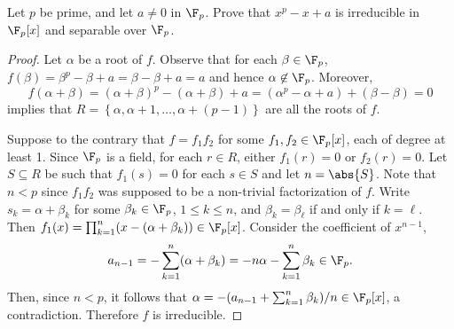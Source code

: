 \documentclass[10pt]{amsart}
\begin{document}
\begin{thm}
  Let $p$ be prime, and let $a \neq 0$ in $\F_p$.
  Prove that $x^p - x + a$ is irreducible in $\F_p[x]$ and separable over $\F_p$.
  \begin{proof}
    Let $\alpha$ be a root of $f$.
    Observe that for each $\beta \in \F_p$, $f(\beta) = \beta^p - \beta + a = \beta - \beta + a = a$ and hence $\alpha \not \in \F_p$.
    Moreover,
    $$f(\alpha + \beta) = (\alpha + \beta)^p - (\alpha + \beta) + a = (\alpha^p - \alpha + a) + (\beta - \beta) = 0$$
    implies that $R = \left\{\alpha, \alpha + 1, \ldots, \alpha + (p-1)\right\}$ are all the roots of $f$.
    
    Suppose to the contrary that $f = f_1f_2$ for some $f_1, f_2 \in \F_p[x]$, each of degree at least 1.
    Since $\F_p$ is a field, for each $r \in R$, either $f_1(r) = 0$ or $f_2(r) = 0$.
    Let $S \subseteq R$ be such that $f_1(s) = 0$ for each $s \in S$ and let $n = \abs{S}$.
    Note that $n < p$ since $f_1f_2$ was supposed to be a non-trivial factorization of $f$.
    Write $s_k = \alpha + \beta_k$ for some $\beta_k \in \F_p$, $1 \leq k \leq n$, and $\beta_k = \beta_\ell$ if and only if $k = \ell$.
    Then $f_1(x) = \prod_{k=1}^n (x - (\alpha + \beta_k)) \in \F_p[x]$.
    Consider the coefficient of $x^{n-1}$, 
    $$a_{n-1} = - \sum_{k=1}^n (\alpha + \beta_k) = - n\alpha - \sum_{k=1}^n \beta_k \in \F_p.$$
    Then, since $n < p$, it follows that $\alpha = -(a_{n-1} + \sum_{k=1}^n \beta_k)/n \in \F_p[x]$, a contradiction.
    Therefore $f$ is irreducible.
    
  \end{proof}
\end{thm}
\end{document}
